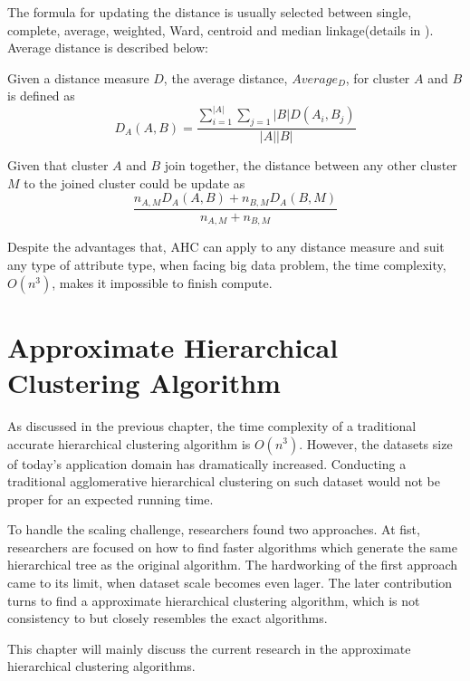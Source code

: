 \documentclass[utf8,english]{gradu3}
\begin{document}
The formula for updating the distance is usually selected between single, complete, average, weighted, Ward, centroid and median linkage(details in \cite{mullner2012fastcluster}). Average distance is described below:

\begin{definition}
	\label{def:average_distance}
	Given a distance measure $D$, the average distance, $Average_D$, for cluster $A$ and $B$ is defined as
	\[
	D_A \left(A, B \right) = \frac{
			\sum\limits_{i=1}^{\lvert  A\rvert } \sum\limits_{j=1} \lvert B \lvert D \left(A_i, B_j \right)		
		}{
			\lvert A \lvert	\lvert B \lvert
		}
	\]
\end{definition}


\begin{definition}
	\label{def:average_updating}
	Given that cluster $A$ and $B$ join together, the distance between any other cluster $M$ to the joined cluster could be update as
	\[
	\frac{
		n_{A,M} D_A \left( A, B \right) + n_{B,M} D_A \left( B, M \right)
		}{
		n_{A, M} + n_{B,M}
		}
\]
\end{definition}


Despite the advantages that, AHC can apply to any distance measure and suit any type of attribute type, when facing big data problem, the time complexity, $O(n^3)$, makes it impossible to finish compute.


\chapter{Approximate Hierarchical Clustering Algorithm}

As discussed in the previous chapter, the time complexity of a traditional accurate hierarchical clustering algorithm is $O(n^3)$. However, the datasets size of today's application domain has dramatically increased. Conducting a traditional agglomerative hierarchical clustering on such dataset would not be proper for an expected running time.

To handle the scaling challenge, researchers found two approaches. At fist, researchers are focused on how to find faster algorithms which generate the same hierarchical tree as the original algorithm. The hardworking of the first approach came to its limit, when dataset scale becomes even lager. The later contribution turns to find a approximate hierarchical clustering algorithm, which is not consistency to but closely resembles the exact algorithms. 

This chapter will mainly discuss the current research in the approximate hierarchical clustering algorithms. 
\end{document}
